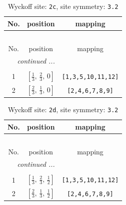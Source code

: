 \documentclass[fleqn,8pt]{jsarticle}
\begin{document}
\begin{longtable}{ccc}
\caption{Wyckoff site: {\tt 2c}, site symmetry: {\tt 3.2}}
 \\
 \hline \hline
No. & position & mapping \\ \hline \endfirsthead

\multicolumn{2}{l}{\tablename\ \thetable{}} \\
 \hline \hline
No. & position & mapping \\ \hline \endhead

 \hline \hline
\multicolumn{2}{r}{\footnotesize\it continued ...} \\ \endfoot

 \hline \hline
\multicolumn{2}{r}{} \\ \endlastfoot

1 & $\left[ \frac{1}{3},\, \frac{2}{3},\, 0 \right]$ & {\tt [1,3,5,10,11,12]} \\ \hline
2 & $\left[ \frac{2}{3},\, \frac{1}{3},\, 0 \right]$ & {\tt [2,4,6,7,8,9]} \\
\end{longtable}
\renewcommand{\arraystretch}{1.2}
\begin{longtable}{ccc}
\caption{Wyckoff site: {\tt 2d}, site symmetry: {\tt 3.2}}
 \\
 \hline \hline
No. & position & mapping \\ \hline \endfirsthead

\multicolumn{2}{l}{\tablename\ \thetable{}} \\
 \hline \hline
No. & position & mapping \\ \hline \endhead

 \hline \hline
\multicolumn{2}{r}{\footnotesize\it continued ...} \\ \endfoot

 \hline \hline
\multicolumn{2}{r}{} \\ \endlastfoot

1 & $\left[ \frac{1}{3},\, \frac{2}{3},\, \frac{1}{2} \right]$ & {\tt [1,3,5,10,11,12]} \\ \hline
2 & $\left[ \frac{2}{3},\, \frac{1}{3},\, \frac{1}{2} \right]$ & {\tt [2,4,6,7,8,9]} \\
\end{longtable}
\renewcommand{\arraystretch}{1.2}
\end{document}
